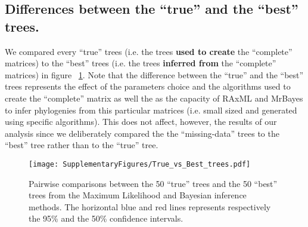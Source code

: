 \documentclass[12pt,letterpaper]{article}
\begin{document}
\subsection{Differences between the ``true'' and the ``best'' trees.}
We compared every ``true'' trees (i.e. the trees \textbf{used to create} the ``complete'' matrices) to the ``best'' trees (i.e. the trees \textbf{inferred from} the ``complete'' matrices) in figure ~\ref{Fig_Supp_True_Best}.
Note that the difference between the ``true'' and the ``best'' trees represents the effect of the parameters choice and the algorithms used to create the ``complete'' matrix as well the as the capacity of RAxML and MrBayes to infer phylogenies from this particular matrices (i.e. small sized and generated using specific algorithms).
This does not affect, however, the results of our analysis since we deliberately compared the the ``missing-data'' trees to the ``best'' tree rather than to the ``true'' tree. 

\begin{figure} 
\centering
    \texttt{[image: SupplementaryFigures/True\_vs\_Best\_trees.pdf]}
    \caption{Pairwise comparisons between the 50 ``true'' trees and the 50 ``best'' trees from the Maximum Likelihood and Bayesian inference methods. The horizontal blue and red lines represents respectively the 95\% and the 50\% confidence intervals.} 
\label{Fig_Supp_True_Best} 
\end{figure}





\end{document}
